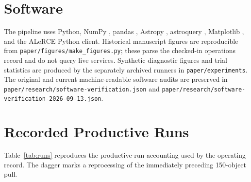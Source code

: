 \documentclass[11pt]{article}
\begin{document}
\section*{Software}

The pipeline uses Python, NumPy \citep{harris2020}, pandas \citep{mckinney2010}, Astropy \citep{astropy2013,astropy2018}, astroquery \citep{ginsburg2019}, Matplotlib \citep{hunter2007}, and the ALeRCE Python client. Historical manuscript figures are reproducible from \texttt{paper/figures/make\_figures.py}; these parse the checked-in operations record and do not query live services. Synthetic diagnostic figures and trial statistics are produced by the separately archived runners in \texttt{paper/experiments}. The original and current machine-readable software audits are preserved in \texttt{paper/research/software-verification.json} and \texttt{paper/research/software-verification-2026-09-13.json}.

\appendix

\section{Recorded Productive Runs}
\label{app:runs}

Table~\ref{tab:runs} reproduces the productive-run accounting used by the operating record. The dagger marks a reprocessing of the immediately preceding 150-object pull.
\end{document}
